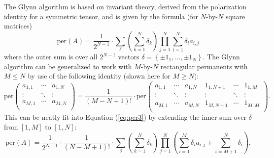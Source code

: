 \documentclass{article}
\begin{document}
The Glynn algorithm is based on invariant theory, derived from the polarization identity for
a symmetric tensor, and is given by the formula (for $N$-by-$N$ square matrices)
\begin{equation} \label{eq:per3}
    \text{per}(A) = \frac{1}{2^{N-1}} \cdot \sum_{\delta}{
        \left(\sum_{k=1}^N{\delta_k}\right)
        \prod_{j=1}^N{\sum_{i=1}^N{\delta_i a_{i,j}}}
    }
\end{equation}
where the outer sum is over all $2^{N-1}$ vectors $\delta = \left\{\pm 1_1,\dots,\pm 1_N\right\}$.
The Glynn algorithm can be generalized to work with $M$-by-$N$ rectangular permanents with $M \leq
N$ by use of the following identity (shown here for $M \geq N$):
\begin{equation} \label{eq:padidentity}
    {\text{per}}\left(
        \begin{matrix}
            a_{1,1} & \cdots & a_{1,N} \\
            \vdots & \ddots & \vdots \\
            a_{M,1} & \cdots & a_{M,N} \\
        \end{matrix}
    \right)
    = \frac{1}{\left(M - N + 1\right)!} \cdot {\text{per}}\left(
        \begin{matrix}
            a_{1,1} & \cdots & a_{1,N} & 1_{1,N+1} & \cdots & 1_{1,M} \\
            \vdots & \ddots & \vdots & \vdots & \ddots & \vdots \\
            a_{M,1} & \cdots & a_{M,N} & 1_{M,N+1} & \cdots & 1_{M,M} \\
        \end{matrix}
    \right).
\end{equation}
This can be neatly fit into Equation (\ref{eq:per3}) by extending the inner sum over $\delta$ from
$\left[1,M\right]$ to $\left[1,N\right]$:
\begin{equation} \label{eq:rectper3}
    \text{per}(A) = \frac{1}{2^{N-1}} \cdot \frac{1}{\left(N - M + 1\right)!} \cdot \sum_{\delta}{
        \left(\sum_{k=1}^N{\delta_k}\right)
        \prod_{j=1}^N{\left(\sum_{i=1}^M{\delta_i a_{i,j}} + \sum_{i=M+1}^N{\delta_i}\right)}
    }.
\end{equation}
\end{document}
